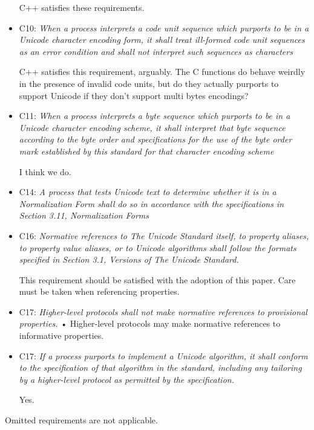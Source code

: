 \documentclass{wg21}
\begin{document}
\begin{itemize}
    C++ satisfies these requirements.

    \item C10: \emph{When a process interprets a code unit sequence which purports to be in a Unicode
        character encoding form, it shall treat ill-formed code unit sequences as an error condition and shall not interpret such sequences as characters}

    C++ satisfies this requirement, arguably. The C functions do behave weirdly in the presence of invalid code units, but do they actually purports to support Unicode if they don't support multi bytes encodings?

    \item C11: \emph{When a process interprets a byte sequence which purports to be in a Unicode character
        encoding scheme, it shall interpret that byte sequence according to the byte order and
        specifications for the use of the byte order mark established by this standard for that
        character encoding scheme}

    I think we do.

    \item C14: \emph{A process that tests Unicode text to determine whether it is in a Normalization Form
        shall do so in accordance with the specifications in Section 3.11, Normalization Forms}


    \item C16: \emph{Normative references to The Unicode Standard itself, to property aliases, to property
        value aliases, or to Unicode algorithms shall follow the formats specified in Section 3.1,
        Versions of The Unicode Standard.}

    This requirement should be satisfied with the adoption of this paper.
    Care must be taken when referencing properties.

    \item C17: \emph{Higher-level protocols shall not make normative references to provisional properties.}
    • Higher-level protocols may make normative references to informative properties.

    \item C17: \emph{If a process purports to implement a Unicode algorithm, it shall conform to the specification of that algorithm in the standard, including any tailoring by a higher-level protocol as permitted by the specification.}

    Yes.
\end{itemize}
Omitted requirements are not applicable.
\end{document}
